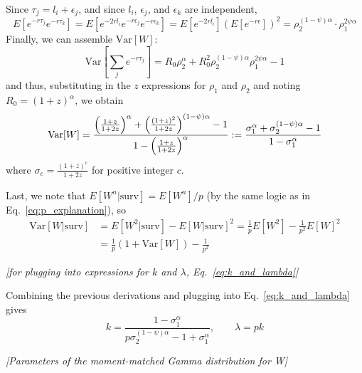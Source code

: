Since $\tau_j = l_i + \epsilon_j$, and since $l_i$, $\epsilon_j$, and $\epsilon_k$ are independent, 
\[ E[e^{-r \tau_j} e^{-r \tau_k}]  = E[e^{-2r l_i} e^{-r \epsilon_j} e^{-r \epsilon_k}] = E[e^{-2r l_i}] (E[e^{-r \epsilon}])^2 = \rho_2^{(1-\psi)\alpha} \cdot \rho _1^{2 \psi \alpha}\]
Finally, we can assemble $\text{Var}[W]$: 
\[
	\text{Var}[\sum_j e^{-r \tau_j}] = R_0 \rho_2^\alpha + R_0^2 \rho_2^{(1-\psi)\alpha} \rho_1^{2 \psi \alpha} - 1
\]
and thus, substituting in the $z$ expressions for $\rho_1$ and $\rho_2$ and noting $R_0 = (1 + z)^\alpha$, we obtain
\begin{equation}
	\text{Var}[W] = \frac{
		\Bigl(\frac{1 + z}{1 + 2z}\Bigr)^\alpha + \Bigl(\frac{(1 + z)^2}{1 + 2z}\Bigr)^{(1-\psi) \alpha} - 1
	}{
		1 - \Bigl(\frac{1 + z}{1 + 2z}\Bigr)^\alpha
	} := 
	\frac{\sigma_1^\alpha + \sigma_2^{(1-\psi)\alpha} - 1}{1 - \sigma_1^\alpha}
\end{equation}
where $\sigma_c = \frac{(1 + z)^c}{1 + 2z}$ for positive integer $c$. 

  Last, we note that $E[W^n|\text{surv}] = E[W^n]/p$
  (by the same logic as in Eq.~\ref{eq:p_explanation}), so
  \begin{align}
      \text{Var}[W | \text{surv}]
      &= E[W^2|\text{surv}] - E[W|\text{surv}]^2 = \frac{1}{p} E[W^2] - \frac{1}{p^2} E[W]^2 \\ 
      &= \boxed{\frac{1}{p} (1 + \text{Var}[W]) - \frac{1}{p^2}}
  \end{align}  
\begin{center}
{\it [for plugging into expressions for $k$ and $\lambda$, Eq.~\ref{eq:k_and_lambda}]}
\end{center}

 Combining the previous derivations and plugging into Eq.~\ref{eq:k_and_lambda} gives 
\begin{equation}
\boxed{k = \frac{1 - \sigma_1^\alpha}{p \sigma_2^{(1 - \psi)\alpha} - 1 + \sigma_1^\alpha},
\qquad
\lambda = p k }
\end{equation}
\begin{center}
	{\it [Parameters of the moment-matched Gamma distribution for W]}
\end{center}

